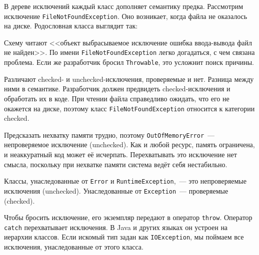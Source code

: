 В дереве исключений каждый класс дополняет семантику предка. Рассмотрим
исключение \verb|FileNotFoundException|. Оно возникает, когда файла не
оказалось на диске. Родословная класса выглядит так:

\linegap

\ifx\DEVICETYPE\MOBILE


\else


\fi

\linegap

\mnoindent
Схему читают <<объект \arr выбрасываемое \arr исключение \arr ошибка
ввода-вывода \arr файл не найден>>. По имени \verb|FileNotFoundException|
легко догадаться, с чем связана проблема. Если же разработчик бросил
\verb|Throwable|, это усложнит поиск причины.

Различают checked- и unchecked-исключения, проверяемые и нет. Разница между ними
в семантике. Разработчик должен предвидеть checked-исключения и обработать их в
коде. При чтении файла справедливо ожидать, что его не окажется на диске,
поэтому класс \verb|FileNotFoundException| относится к категории checked.


\label{exc-hierarchy}

Предсказать нехватку памяти трудно, поэтому \texttt{OutOfMemoryError}~---
непроверяемое исключение (unchecked). Как и любой ресурс, память ограничена, и
неаккуратный код может её исчерпать. Перехватывать это исключение нет смысла,
поскольку при нехватке памяти система ведёт себя нестабильно.


Классы, унаследованные от \verb|Error| и \texttt{Runtime\-Exception},~--- это
непроверяемые исключения (unchecked). Унаследованные от \verb|Exception|~---
проверяемые (checked).


Чтобы бросить исключение, его экземпляр передают в оператор
\verb|throw|. Оператор \verb|catch| перехватывает исключения. В Java и других
языках он устроен на иерархии классов. Если искомый тип задан как
\verb|IOException|, мы поймаем все исключения, унаследованные от этого класса.

